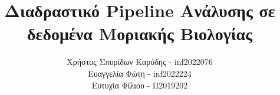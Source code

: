 \documentclass[hidelinks, a4paper, 12pt]{report}
\title{Διαδραστικό \foreignlanguage{english}{Pipeline} Ανάλυσης σε δεδομένα Μοριακής Βιολογίας}
\author{Χρήστος Σπυρίδων Καρύδης - \foreignlanguage{english}{inf2022076}\\ Ευαγγελία Φώτη - \foreignlanguage{english}{inf2022224}\\ Ευτυχία Φίλιου - Π2019202}
\begin{document}


\renewcommand{\contentsname}{Περιεχόμενα}
\renewcommand{\listfigurename}{Λίστα Σχημάτων}
\renewcommand{\listtablename}{Λίστα Πινάκων}
\renewcommand{\chaptername}{Κεφάλαιο}
\renewcommand{\appendixname}{Παράρτημα}
\renewcommand{\bibname}{Βιβλιογραφία}

\setlength{\parskip}{0.5em}
\tableofcontents
\newpage

\setlength{\parskip}{1em}










\appendix
% 

\printbibliography[heading=bibintoc]
\end{document}

